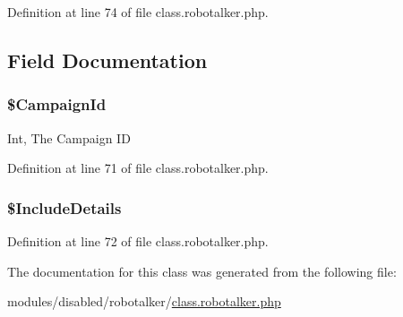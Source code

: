 Definition at line 74 of file class.\-robotalker.\-php.



\subsection{Field Documentation}
\hypertarget{class_get_campaign_stats_request_a2d22a3b5dcd66a7b8cc5db60947b5ca3}{
\subsubsection[{\$\-Campaign\-Id}]{\setlength{\rightskip}{0pt plus 5cm}\$Campaign\-Id}}\label{class_get_campaign_stats_request_a2d22a3b5dcd66a7b8cc5db60947b5ca3}
Int, The Campaign I\-D 

Definition at line 71 of file class.\-robotalker.\-php.

\hypertarget{class_get_campaign_stats_request_a6a7dc0605d9a2e10066aeb57b77fc272}{
\subsubsection[{\$\-Include\-Details}]{\setlength{\rightskip}{0pt plus 5cm}\$Include\-Details}}\label{class_get_campaign_stats_request_a6a7dc0605d9a2e10066aeb57b77fc272}


Definition at line 72 of file class.\-robotalker.\-php.



The documentation for this class was generated from the following file\-:\begin{DoxyCompactItemize}
\item 
modules/disabled/robotalker/\hyperlink{class_8robotalker_8php}{class.\-robotalker.\-php}\end{DoxyCompactItemize}
